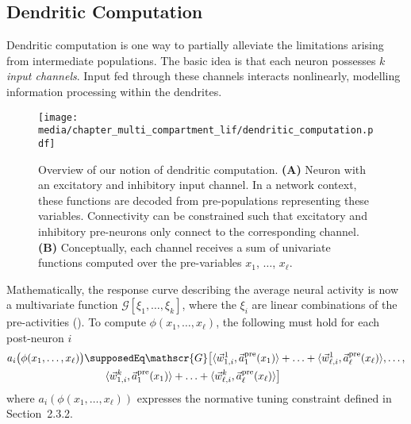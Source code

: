 \subsection{Dendritic Computation}
\label{sec:dendritic_computation_theory_dendritic}

Dendritic computation is one way to partially alleviate the limitations arising from intermediate populations.
The basic idea is that each neuron possesses $k$ \emph{input channels}.
Input fed through these channels interacts nonlinearly, modelling information processing within the dendrites.

\begin{figure}
	\texttt{[image: media/chapter\_multi\_compartment\_lif/dendritic\_computation.pdf]}%
	{\label{fig:dendritic_computation_net}}%
	{\label{fig:dendritic_computation_fun}}%
	\caption[Overview of our notion of dendritic computation.]{Overview of our notion of dendritic computation. \textbf{(A)} Neuron with an excitatory and inhibitory input channel. In a network context, these functions are decoded from pre-populations representing these variables. Connectivity can be constrained such that excitatory and inhibitory pre-neurons only connect to the corresponding channel. \textbf{(B)} Conceptually, each channel receives a sum of univariate functions computed over the pre-variables $x_1$, $\ldots$, $x_\ell$.}
\end{figure}

Mathematically, the response curve describing the average neural activity is now a multivariate function $\mathscr{G}[\xi_1, \ldots, \xi_k]$, where the $\xi_i$ are linear combinations of the pre-activities ().
To compute $\phi(x_1, \ldots, x_\ell)$, the following must hold for each post-neuron $i$
\begin{align}
	\begin{aligned}
	a_i\bigl(\phi(x_1, \ldots, x_\ell)\bigr) &\supposedEq
	\mathscr{G} \bigl[
		\langle \vec w_{1, i}^1, \vec a^\mathrm{pre}_1(x_1) \rangle + \ldots +
		\langle \vec w_{\ell, i}^1, \vec a^\mathrm{pre}_\ell(x_\ell) \rangle, \ldots,\\
	&~\hspace{1.66em}
		\langle \vec w_{1, i}^k, \vec a^\mathrm{pre}_1(x_1) \rangle + \ldots +
		\langle \vec w_{\ell, i}^k, \vec a^\mathrm{pre}_\ell(x_\ell) \rangle
	\bigr]
	\end{aligned}
	\label{eqn:dendritic}
\end{align}
where $a_i(\phi(x_1, \ldots, x_\ell))$ expresses the normative tuning constraint defined in Section~2.3.2.

